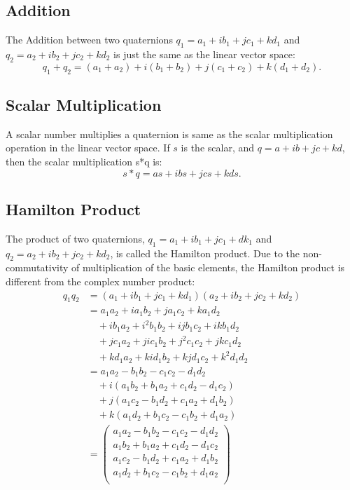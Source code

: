 \documentclass{article}
\begin{document}
\subsection{Addition}

The Addition between two quaternions $q_1 = a_1 + ib_1+jc_1+kd_1$ and $q_2 = a_2 + ib_2+jc_2+kd_2$ is just the same as the linear vector space:
\begin{displaymath}
  q_1 + q_2 = (a_1+a_2) + i(b_1+b_2) + j(c_1+c_2) + k(d_1+d_2).
\end{displaymath}

\subsection{Scalar Multiplication}

A scalar number multiplies a quaternion is same as the scalar multiplication operation in the linear vector space. If $s$ is the scalar, and $q=a+ib+jc+kd$, then the scalar multiplication s*q is:
\begin{displaymath}
  s*q =  as+ibs+jcs+kds.
\end{displaymath}

\subsection{Hamilton Product}

The product of two quaternions, $q_1=a_1+ib_1+jc_1+dk_1$ and $q_2=a_2+ib_2+jc_2+kd_2$, is called the Hamilton product. Due to the non-commutativity of multiplication of the basic elements, the Hamilton product is different from the complex number product:
\begin{displaymath}
  \begin{split}
    q_1q_2 &= (a_1+ib_1+jc_1+kd_1)(a_2+ib_2+jc_2+kd_2) \\
    &= a_1a_2+ia_1b_2+ja_1c_2+ka_1d_2             \\
    &\quad +ib_1a_2+i^2b_1b_2+ijb_1c_2+ikb_1d_2   \\
    &\quad +jc_1a_2+jic_1b_2+j^2c_1c_2+jkc_1d_2   \\
    &\quad +kd_1a_2+kid_1b_2+kjd_1c_2+k^2d_1d_2   \\
    &= a_1a_2-b_1b_2-c_1c_2-d_1d_2                \\
    &\quad +i(a_1b_2+b_1a_2+c_1d_2-d_1c_2)         \\
    &\quad +j(a_1c_2-b_1d_2+c_1a_2+d_1b_2)         \\
    &\quad +k(a_1d_2+b_1c_2-c_1b_2+d_1a_2)         \\
    & = \begin{pmatrix}
      a_1a_2-b_1b_2-c_1c_2-d_1d_2         \\
      a_1b_2+b_1a_2+c_1d_2-d_1c_2         \\
      a_1c_2-b_1d_2+c_1a_2+d_1b_2         \\
      a_1d_2+b_1c_2-c_1b_2+d_1a_2         \\
    \end{pmatrix}
  \end{split}
\end{displaymath}
\end{document}
